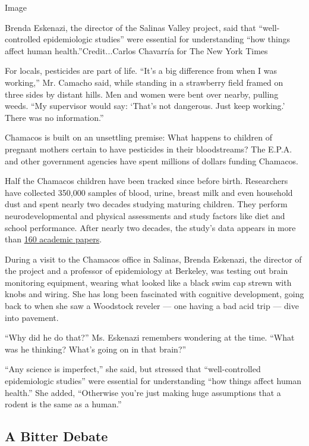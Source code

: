 Image

Brenda Eskenazi, the director of the Salinas Valley project, said that
``well-controlled epidemiologic studies'' were essential for
understanding ``how things affect human health.''Credit...Carlos
Chavarría for The New York Times

For locals, pesticides are part of life. ``It's a big difference from
when I was working,'' Mr. Camacho said, while standing in a strawberry
field framed on three sides by distant hills. Men and women were bent
over nearby, pulling weeds. ``My supervisor would say: `That's not
dangerous. Just keep working.' There was no information.''

Chamacos is built on an unsettling premise: What happens to children of
pregnant mothers certain to have pesticides in their bloodstreams? The
E.P.A. and other government agencies have spent millions of dollars
funding Chamacos.

Half the Chamacos children have been tracked since before birth.
Researchers have collected 350,000 samples of blood, urine, breast milk
and even household dust and spent nearly two decades studying maturing
children. They perform neurodevelopmental and physical assessments and
study factors like diet and school performance. After nearly two
decades, the study's data appears in more than
\href{https://www.ncbi.nlm.nih.gov/myncbi/browse/collection/51228867/}{160
academic papers}.

During a visit to the Chamacos office in Salinas, Brenda Eskenazi, the
director of the project and a professor of epidemiology at Berkeley, was
testing out brain monitoring equipment, wearing what looked like a black
swim cap strewn with knobs and wiring. She has long been fascinated with
cognitive development, going back to when she saw a Woodstock reveler
--- one having a bad acid trip --- dive into pavement.

``Why did he do that?'' Ms. Eskenazi remembers wondering at the time.
``What was he thinking? What's going on in that brain?''

``Any science is imperfect,'' she said, but stressed that
``well-controlled epidemiologic studies'' were essential for
understanding ``how things affect human health.'' She added, ``Otherwise
you're just making huge assumptions that a rodent is the same as a
human.''

\hypertarget{a-bitter-debate}{%
\subsection{A Bitter Debate}\label{a-bitter-debate}}

